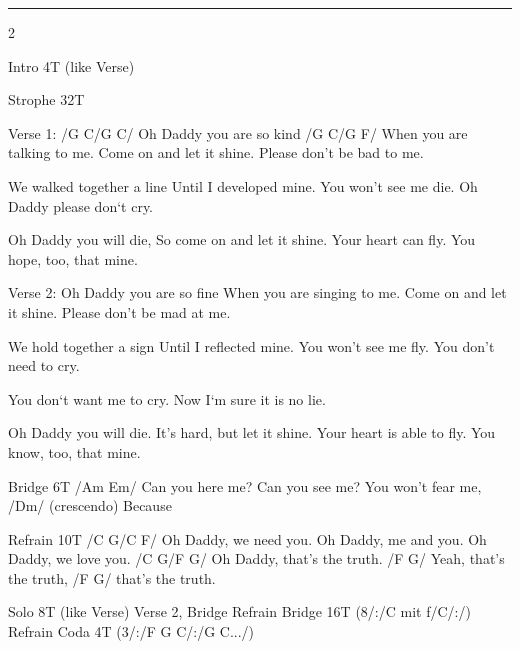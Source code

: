 \noindent\rule{\columnwidth}{1pt}

\begin{multicols}{2}
\begin{lstsong}
Intro 4T (like Verse)

Strophe 32T

Verse 1:
/G C/G C/
Oh Daddy you are so kind
/G C/G F/
When you are talking to me.
Come on and let it shine.
Please don't be bad to me.

We walked together a line
Until I developed mine.
You won't see me die.	
Oh Daddy please don`t cry.

Oh Daddy you will die,
So come on and let it shine.
Your heart can fly.
You hope, too, that mine.

Verse 2:
Oh Daddy you are so fine
When you are singing to me.
Come on and let it shine.
Please don't be mad at me.

We hold together a sign
Until I reflected mine.
You won't see me fly.
You don't need to cry.

You don`t want me to cry.
Now I`m sure it is no lie.

Oh Daddy you will die.
It's hard, but let it shine.
Your heart is able to fly.
You know, too, that mine.

Bridge 6T
/Am Em/
Can you here me?
Can you see me?
You won't fear me,
/Dm/ (crescendo)
Because

Refrain 10T
/C G/C F/
Oh Daddy, we need you.
Oh Daddy, me and you.
Oh Daddy, we love you.
/C G/F G/
Oh Daddy, that's the truth.
/F G/
Yeah, that's the truth,
/F G/
that's the truth.

Solo 8T (like Verse)
Verse 2, Bridge Refrain
Bridge 16T (8/:/C mit f/C/:/)
Refrain
Coda 4T (3/:/F G C/:/G C.../)
\end{lstsong}
\end{multicols}
\newpage

